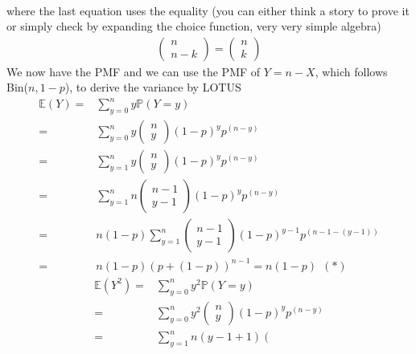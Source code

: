\begin{exercise} [BH.4.21]
\begin{solution}
\begin{enumerate}
\begin{align*}
		\end{align*}
		where the last equation uses the equality (you can either think a story to prove it or simply check by expanding the choice function, very very simple algebra)
		\begin{align*}
			\left(\begin{matrix}
				n \\ n-k
			\end{matrix} \right)= 
			\left(\begin{matrix}
				n \\ k
			\end{matrix} \right)
		\end{align*}
		We now have the PMF and we can use the PMF of $Y=n-X$, which follows Bin($n,1-p$), to derive the variance by LOTUS
		\begin{align*}
			\mathbb{E}(Y) =	 
			& \sum_{y=0}^{n} y \mathbb{P}(Y=y) \\=& \sum_{y=0}^{n} y 	\left(\begin{matrix}
				n \\ y
			\end{matrix} \right) (1-p)^yp^{(n-y)} \\=& \sum_{y=1}^{n} y 	\left(\begin{matrix}
				n \\ y
			\end{matrix} \right) (1-p)^yp^{(n-y)} \\=& \sum_{y=1}^{n} n 	\left(\begin{matrix}
				n-1 \\ y-1
			\end{matrix} \right) (1-p)^yp^{(n-y)}  \\=& n (1-p)   \sum_{y=1}^{n}  	\left(\begin{matrix}
				n-1 \\ y-1
			\end{matrix} \right) (1-p)^{y-1}p^{(n-1-(y-1))}  \\
			=& n(1-p)(p+(1-p))^{n-1} =n(1-p)~~ (*)
		\end{align*}
		\begin{align*}
			\mathbb{E}(Y^2) =	 
			& \sum_{y=0}^{n} y^2 \mathbb{P}(Y=y) \\=& \sum_{y=0}^{n} y^2 	\left(\begin{matrix}
				n \\ y
			\end{matrix} \right) (1-p)^yp^{(n-y)} \\=& \sum_{y=1}^{n} n 	(y-1 +1)\left(\begin{matrix}

\end{matrix}
\end{align*}
\end{enumerate}
\end{solution}
\end{exercise}
